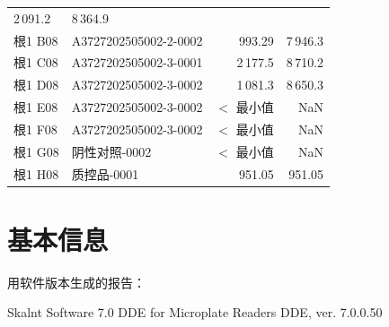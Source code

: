 \documentclass[UTF8,10pt,a4paper,fontset=fandol]{ctexart}
\newcommand{\fieldvalue}[1]{#1}
\begin{document}
\begin{tabularx}{\textwidth}{@{}lXrr@{}}
\fieldvalue{2\,091.2} &
\fieldvalue{8\,364.9}\\
根1 B08 &
\fieldvalue{A3727202505002-2-0002} &
\fieldvalue{993.29} &
\fieldvalue{7\,946.3}\\
根1 C08 &
\fieldvalue{A3727202505002-3-0001} &
\fieldvalue{2\,177.5} &
\fieldvalue{8\,710.2}\\
根1 D08 &
\fieldvalue{A3727202505002-3-0002} &
\fieldvalue{1\,081.3} &
\fieldvalue{8\,650.3}\\
根1 E08 &
\fieldvalue{A3727202505002-3-0002} &
\fieldvalue{$<$ 最小值} &
\fieldvalue{NaN}\\
根1 F08 &
\fieldvalue{A3727202505002-3-0002} &
\fieldvalue{$<$ 最小值} &
\fieldvalue{NaN}\\
根1 G08 &
\fieldvalue{阴性对照-0002} &
\fieldvalue{$<$ 最小值} &
\fieldvalue{NaN}\\
根1 H08 &
\fieldvalue{质控品-0001} &
\fieldvalue{951.05} &
\fieldvalue{951.05}
\end{tabularx}

\section{基本信息}

用软件版本生成的报告：

\fieldvalue{Skalnt Software 7.0 DDE for Microplate Readers DDE, ver. 7.0.0.50}
\end{document}
